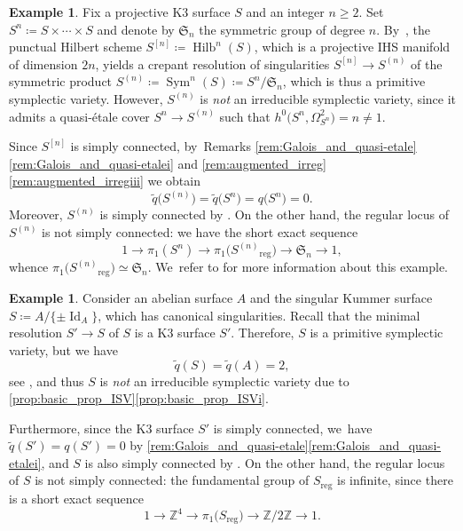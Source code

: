 \documentclass[10pt]{amsart}
\theoremstyle{plain}
\theoremstyle{definition}
\newtheorem{exa}[thm]{Example}
\newcommand{\Z}{\mathbb{Z}}
\DeclareMathOperator{\Id}{Id}
\DeclareMathOperator{\Hilb}{Hilb}
\DeclareMathOperator{\Sym}{Sym}
\begin{document}
\begin{exa}
\label{example:symmetric_product_K3s}
Fix a projective K3 surface $S$ and an integer $n \geq 2$. Set $S^n \coloneqq S \times \cdots \times S$ and denote by $\mathfrak{S}_n$ the symmetric group of degree $n$. By~\cite[\S 6]{Beauville83a}, the punctual Hilbert scheme $S^{[n]} \coloneqq \Hilb^n(S)$, which is a projective IHS manifold of dimension $2n$, yields a crepant resolution of singularities $S^{[n]} \to S^{(n)}$ of the symmetric product $S^{(n)} \coloneqq \Sym^n(S) \coloneqq S^n / \mathfrak{S}_n$, which is thus a primitive symplectic variety.
However, $S^{(n)}$ is \emph{not} an irreducible symplectic variety, since it admits a quasi-étale cover $S^n \to S^{(n)}$ such that $h^0 \bigl(S^n,\Omega^2_{S^n} \bigr) = n \neq 1$.

Since $S^{[n]}$ is simply connected, by~Remarks \ref{rem:Galois_and_quasi-etale}\eqref{rem:Galois_and_quasi-etalei} and \ref{rem:augmented_irreg}\eqref{rem:augmented_irregiii} we obtain
\[
\widetilde{q} \bigl(S^{(n)} \bigr) = \widetilde{q} \bigl(S^n \bigr) = q \bigl(S^n \bigr) = 0.
\]
Moreover, $S^{(n)}$ is simply connected by \cite[\S 6, Lem.\,1]{Beauville83a}. On the other hand, the regular locus of $S^{(n)}$ is not simply connected: we have the short exact sequence
\[
1 \to \pi_1(S^n) \to \pi_1 \bigl({S^{(n)}}_\text{reg} \bigr) \to \mathfrak{S}_n \to 1,
\]
whence $\pi_1 \bigl({S^{(n)}}_\text{reg} \bigr) \simeq \mathfrak{S}_n$. We~refer to \cite[p.\,156 (symmetric products of K3 surfaces), p.\ 164 (paragraph\ after the proof of Prop.\,3), \& Prop.\,5]{Perego20} for more information about this example.
\end{exa}

\begin{exa}
\label{example:singular_Kummer_surface}
Consider an abelian surface $A$ and the singular Kummer surface $S \coloneqq A / \{ \pm \Id_A \}$, which has canonical singularities.
Recall that the minimal resolution $S' \to S$ of $S$ is a K3 surface $S'$. Therefore, $S$ is a primitive symplectic variety, but we have
\[
\widetilde{q}(S) = \widetilde{q}(A) = 2,
\]
see \cite[Lem.\,2.19]{GGK19}, and thus $S$ is \emph{not} an irreducible symplectic variety due to \autoref{prop:basic_prop_ISV}\eqref{prop:basic_prop_ISVi}.

Furthermore, since the K3 surface $S'$ is simply connected, we~have \hbox{$\widetilde{q}(S') \!=\! q(S') \!=\! 0$} by \autoref{rem:Galois_and_quasi-etale}\eqref{rem:Galois_and_quasi-etalei}, and $S$ is also simply connected by \cite[Th.\,1.1]{Tak03}. On the other hand, the regular locus of $S$ is not simply connected: the fundamental group of $S_\text{reg}$ is infinite, since there is a short exact sequence
\[
1 \to \Z^4 \to \pi_1 \bigl(S_\text{reg} \bigr) \to \Z / 2\Z \to 1.
\]
\end{exa}
\end{document}
